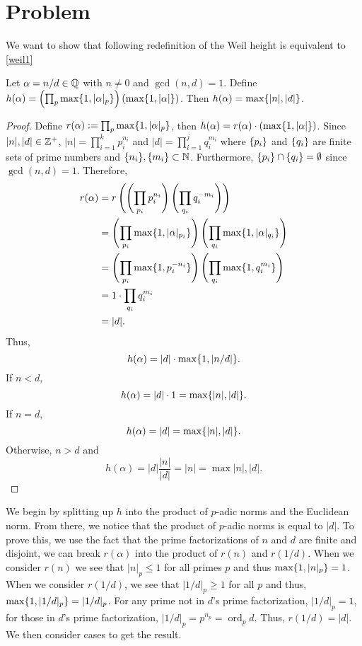 \documentclass[notitlepage]{simple}
\def\ord{\operatorname{ord}}
\begin{document}
\section{Problem}

We want to show that following redefinition of the Weil height is equivalent to \autoref{weil1}

\begin{thm}
	Let $\alpha=n/d\in\mathbb{Q}$ with $n\neq 0$ and $\gcd(n,d)=1$.
	Define $h(\alpha)=\left( \prod_p \max\lbrace 1,|\alpha|_p \rbrace \right)\left( \max\lbrace 1,|\alpha| \rbrace \right)$.
	Then $h(\alpha)=\max\lbrace |n|,|d| \rbrace$.
\end{thm}
\begin{proof}
	Define $r(\alpha):=\prod_p \max\lbrace 1,|\alpha|_p \rbrace$, then $h(\alpha)=r(\alpha)\cdot\left( \max\lbrace 1,|\alpha| \rbrace \right)$.
	Since $|n|,|d|\in\mathbb{Z}^+$, $|n|=\prod_{i=1}^k p_i^{n_i}$ and $|d|=\prod_{i=1}^j q_i^{m_i}$ where $\lbrace p_i \rbrace$ and $\lbrace q_i \rbrace$ are finite sets of prime numbers and $\lbrace n_i \rbrace,\lbrace m_i \rbrace\subset\mathbb{N}$.
	Furthermore, $\lbrace p_i \rbrace\cap\lbrace q_i \rbrace=\emptyset$ since $\gcd(n,d)=1$.
	Therefore,
	\begin{align*}
		r(\alpha)
		&=r\left( \left( \prod_{p_i} p_i^{n_i} \right)\left( \prod_{q_i} q_i^{-m_i} \right)  \right)\\
		&=\left( \prod_{p_i} \max\lbrace 1,|\alpha|_{p_i} \rbrace \right)\left( \prod_{q_i} \max\lbrace 1,|\alpha|_{q_i} \rbrace \right)\\
		&=\left( \prod_{p_i} \max\lbrace 1,p_i^{-n_i} \rbrace \right)\left( \prod_{q_i} \max\lbrace 1,q_i^{m_i} \rbrace \right)\\
		&=1\cdot\prod_{q_i} q_i^{m_i}\\
		&=|d|.
	\end{align*}
	Thus,
	\[
		h(\alpha)=|d|\cdot\max\lbrace 1,|n/d| \rbrace.
	\]
	If $n<d$,
	\[
		h(\alpha) = |d|\cdot 1 = \max\lbrace |n|,|d| \rbrace.
	\]
	If $n=d$,
	\[
		h(\alpha) = |d| =\max\lbrace |n|,|d| \rbrace.
	\]
	Otherwise, $n> d$ and
	\[
		h(\alpha) = |d|\frac{|n|}{|d|}=|n|=\max{|n|,|d|}.
	\]
\end{proof}
\begin{analysis}
	We begin by splitting up $h$ into the product of $p$-adic norms and the Euclidean norm.
	From there, we notice that the product of $p$-adic norms is equal to $|d|$.
	To prove this, we use the fact that the prime factorizations of $n$ and $d$ are finite and disjoint, we can break $r(\alpha)$ into the product of $r(n)$ and $r(1/d)$.
	When we consider $r(n)$ we see that $|n|_p\leq 1$ for all primes $p$ and thus $\max\lbrace 1,|n|_p \rbrace=1$.
	When we consider $r(1/d)$, we see that $|1/d|_p\geq 1$ for all $p$ and thus, $\max\lbrace 1,|1/d|_p \rbrace=|1/d|_p$.
	For any prime not in $d$'s prime factorization, $|1/d|_p=1$, for those in $d$'s prime factorization, $|1/d|_p=p^{n_p}=\ord_p d$.
	Thus, $r(1/d)=|d|$.
	We then consider cases to get the result.
\end{analysis}

\printbibliography
\end{document}
